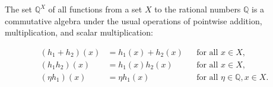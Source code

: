 The set $\mathbb{Q}^X$ of all functions from a set $X$ to the rational numbers $\mathbb{Q}$ is a commutative algebra under the usual operations of pointwise addition, multiplication, and scalar multiplication:

\begin{align*}
(h_1 + h_2)(x) &= h_1(x) + h_2(x) &&\text{for all } x \in X,\\
(h_1h_2)(x) &= h_1(x)h_2(x) &&\text{for all } x \in X,\\
(\eta h_1)(x) &= \eta h_1(x) &&\text{for all } \eta \in \mathbb{Q}, x \in X.
\end{align*}
